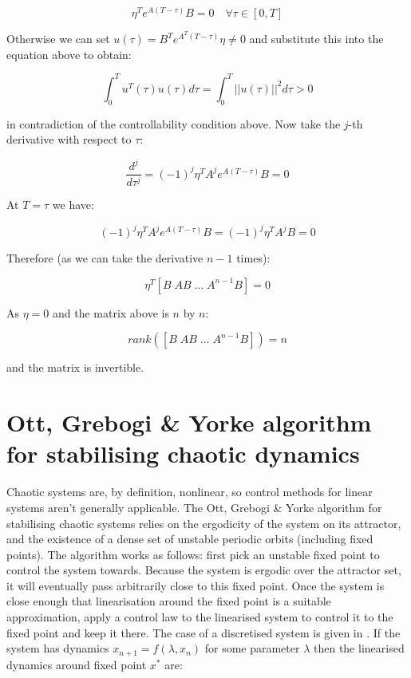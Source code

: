 \documentclass[11pt]{article} %
\begin{document}
\begin{equation}
\eta^{T}e^{A(T-\tau)}B = 0 \quad \forall \tau \in [0, T]
\end{equation}

Otherwise we can set $u(\tau) = B^{T}e^{A^{T}(T - \tau)}\eta \not= 0$ and substitute this into the equation above to obtain:

\begin{equation}
\int^{T}_{0}u^{T}(\tau)u(\tau)d\tau = \int^{T}_{0}||u(\tau)||^{2} d\tau > 0
\end{equation}

in contradiction of the controllability condition above. Now take the $j$-th derivative with respect to $\tau$:

\begin{equation}
\frac{d^{j}}{d \tau^{j}} = (-1)^{j}\eta^{T}A^{j}e^{A(T-\tau)}B = 0
\end{equation}

At $T = \tau$ we have:

\begin{equation}
(-1)^{j}\eta^{T}A^{j}e^{A(T-\tau)}B = (-1)^{j}\eta^{T}A^{j}B = 0
\end{equation}

Therefore (as we can take the derivative $n-1$ times):

\begin{equation}
\eta^{T}[B\; AB\; ... \; A^{n-1}B] = 0
\end{equation}

As $\eta = 0$ and the matrix above is $n$ by $n$:

\begin{equation}
rank([B\; AB\; ... \; A^{n-1}B]) = n
\end{equation}

and the matrix is invertible.

\section{Ott, Grebogi \& Yorke algorithm for stabilising chaotic dynamics}
Chaotic systems are, by definition, nonlinear, so control methods for linear systems aren't generally applicable. The Ott, Grebogi \& Yorke algorithm \cite{ott_paper_1996} for stabilising chaotic systems relies on the ergodicity of the system on its attractor, and the existence of a dense set of unstable periodic orbits (including fixed points). 
\newline
\newline
The algorithm works as follows: first pick an unstable fixed point to control the system towards. Because the system is ergodic over the attractor set, it will eventually pass arbitrarily close to this fixed point. Once the system is close enough that linearisation around the fixed point is a suitable approximation, apply a control law to the linearised system to control it to the fixed point and keep it there.
\newline
\newline
The case of a discretised system is given in \cite{bechhoefer_feedback_2005}. If the system has dynamics $x_{n+1} = f(\lambda, x_{n})$ for some parameter $\lambda$ then the linearised dynamics around fixed point $x^{*}$ are:
\end{document}
